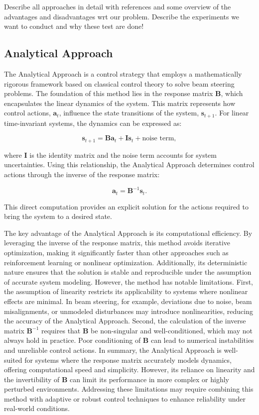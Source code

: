 \documentclass[journal,article,submit,pdftex,moreauthors]{Definitions/mdpi}
\begin{document}
Describe all approaches in detail with references and some overview of the advantages and disadvantages wrt our problem.
Describe the experiments we want to conduct and why these test are done!
\subsection{Analytical Approach}


The Analytical Approach is a control strategy that employs a mathematically rigorous framework based on classical control theory to solve beam steering problems. The foundation of this method lies in the response matrix $\mathbf{B}$, which encapsulates the linear dynamics of the system. This matrix represents how control actions, $\mathbf{a}_t$, influence the state transitions of the system, $\mathbf{s}_{t+1}$. For linear time-invariant systems, the dynamics can be expressed as:

\[
\mathbf{s}_{t+1} = \mathbf{B} \mathbf{a}_t + \mathbf{I} \mathbf{s}_t + \text{noise term},
\]

where $\mathbf{I}$ is the identity matrix and the noise term accounts for system uncertainties. Using this relationship, the Analytical Approach determines control actions through the inverse of the response matrix:

\[
\mathbf{a}_t = \mathbf{B}^{-1} \mathbf{s}_t.
\]

This direct computation provides an explicit solution for the actions required to bring the system to a desired state.

The key advantage of the Analytical Approach is its computational efficiency. By leveraging the inverse of the response matrix, this method avoids iterative optimization, making it significantly faster than other approaches such as reinforcement learning or nonlinear optimization. Additionally, its deterministic nature ensures that the solution is stable and reproducible under the assumption of accurate system modeling. However, the method has notable limitations. First, the assumption of linearity restricts its applicability to systems where nonlinear effects are minimal. In beam steering, for example, deviations due to noise, beam misalignments, or unmodeled disturbances may introduce nonlinearities, reducing the accuracy of the Analytical Approach. Second, the calculation of the inverse matrix $\mathbf{B}^{-1}$ requires that $\mathbf{B}$ be non-singular and well-conditioned, which may not always hold in practice. Poor conditioning of $\mathbf{B}$ can lead to numerical instabilities and unreliable control actions.
In summary, the Analytical Approach is well-suited for systems where the response matrix accurately models dynamics, offering computational speed and simplicity. However, its reliance on linearity and the invertibility of $\mathbf{B}$ can limit its performance in more complex or highly perturbed environments. Addressing these limitations may require combining this method with adaptive or robust control techniques to enhance reliability under real-world conditions.
\end{document}
